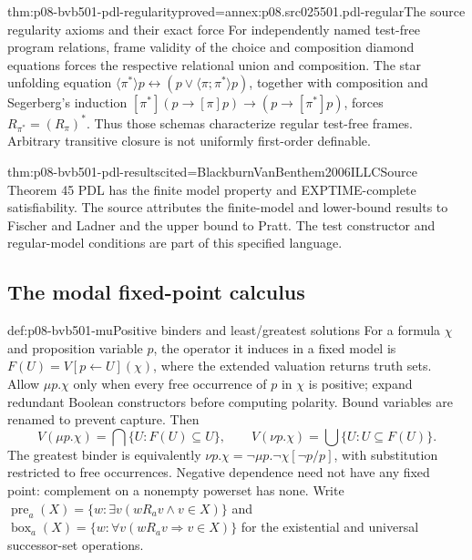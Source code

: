 \begin{hbtheorem}{thm:p08-bvb501-pdl-regularity}{proved=annex:p08.src025501.pdl-regular}{The source regularity axioms and their exact force}
For independently named test-free program relations, frame validity of
the choice and composition diamond equations forces the respective
relational union and composition. The star unfolding equation
\(\langle\pi^*\rangle p\leftrightarrow
(p\lor\langle\pi;\pi^*\rangle p)\), together with composition
and Segerberg's induction
\([\pi^*](p\to[\pi]p)\to(p\to[\pi^*]p)\), forces
\(R_{\pi^*}=(R_\pi)^*\). Thus those schemas characterize
regular test-free frames. Arbitrary transitive closure is not uniformly
first-order definable.
\end{hbtheorem}

\begin{hbtheorem}{thm:p08-bvb501-pdl-results}{cited=BlackburnVanBenthem2006ILLC}{Source Theorem 45}
PDL has the finite model property and EXPTIME-complete satisfiability.
The source attributes the finite-model and lower-bound results to
Fischer and Ladner and the upper bound to Pratt. The test constructor
and regular-model conditions are part of this specified language.
\end{hbtheorem}

\subsection{The modal fixed-point calculus}
\label{sec:p08-bvb501-mu}

\begin{hbdefinition}{def:p08-bvb501-mu}{Positive binders and least/greatest solutions}
For a formula \(\chi\) and proposition variable \(p\), the
operator it induces in a fixed model is
\(F(U)=V[p\leftarrow U](\chi)\), where the extended valuation
returns truth sets. Allow \(\mu p.\chi\) only when every free
occurrence of \(p\) in \(\chi\) is positive; expand redundant
Boolean constructors before computing polarity. Bound variables are
renamed to prevent capture. Then
\[
 V(\mu p.\chi)=\bigcap\{U:F(U)\subseteq U\},\qquad
 V(\nu p.\chi)=\bigcup\{U:U\subseteq F(U)\}.
\]
The greatest binder is equivalently
\(\nu p.\chi=\neg\mu p.\neg\chi[\neg p/p]\), with
substitution restricted to free occurrences. Negative dependence need
not have any fixed point: complement on a nonempty powerset has none.
Write \(\operatorname{pre}_a(X)=\{w:\exists v(wR_av\land v\in X)\}\)
and \(\operatorname{box}_a(X)=\{w:\forall v(wR_av\Rightarrow v\in X)\}\)
for the existential and universal successor-set operations.
\end{hbdefinition}

